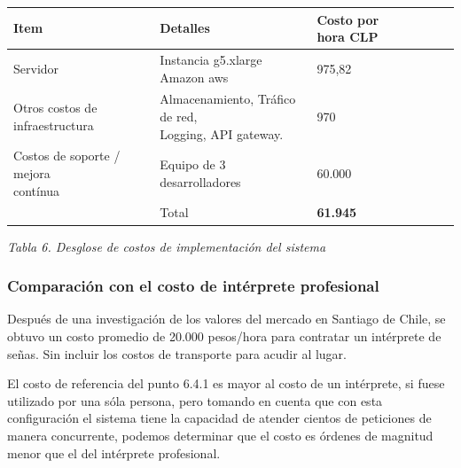\documentclass[10pt]{article}
\begin{document}
\begin{table}[H]
\begin{adjustbox}{max width=\textwidth}
\begin{tabular}{p{4.21cm}p{6.8cm}p{5.5cm}p{4.21cm}p{6.8cm}p{5.5cm}}
\hline
\multicolumn{1}{|p{4.21cm}}{Item} & 
\multicolumn{1}{|p{6.8cm}}{Detalles} & 
\multicolumn{1}{|p{5.5cm}|}{Costo por hora CLP} \\ 
\hline
\multicolumn{1}{|p{4.21cm}}{Servidor} & 
\multicolumn{1}{|p{6.8cm}}{Instancia g5.xlarge Amazon aws} & 
\multicolumn{1}{|p{5.5cm}|}{975,82} \\ 
\hline
\multicolumn{1}{|p{4.21cm}}{Otros costos de infraestructura} & 
\multicolumn{1}{|p{6.8cm}}{Almacenamiento, Tráfico de red, \newline
Logging, API gateway.} & 
\multicolumn{1}{|p{5.5cm}|}{970} \\ 
\hline
\multicolumn{1}{|p{4.21cm}}{Costos de soporte / mejora \newline
contínua \newline
} & 
\multicolumn{1}{|p{6.8cm}}{Equipo de 3 desarrolladores } & 
\multicolumn{1}{|p{5.5cm}|}{60.000} \\ 
\hline
\multicolumn{1}{|p{4.21cm}}{} & 
\multicolumn{1}{|p{6.8cm}}{Total} & 
\multicolumn{1}{|p{5.5cm}|}{\textbf{61.945}} \\ 
\hline
\end{tabular}
\end{adjustbox}
\end{table}
\vspace{1\baselineskip}
\begin{center}
\textit{Tabla 6. Desglose de costos de implementación del sistema}
\end{center}


\vspace{1\baselineskip}
\subsubsection{Comparación con el costo de intérprete profesional}

\vspace{1\baselineskip}
Después de una investigación de los valores del mercado en Santiago de Chile, se obtuvo un costo promedio de 20.000 pesos/hora para contratar un intérprete de señas. Sin incluir los costos de transporte para acudir al lugar.

\vspace{1\baselineskip}
El costo de referencia del punto 6.4.1 es mayor al costo de un intérprete, si fuese utilizado por una sóla persona, pero tomando en cuenta que con esta configuración el sistema tiene la capacidad de atender cientos de peticiones de manera concurrente, podemos determinar que el costo es órdenes de magnitud menor que el del intérprete profesional.
\end{document}
